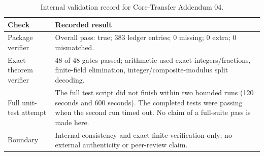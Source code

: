 \begin{table}[htbp]
\centering
\caption{Internal validation record for Core-Transfer Addendum 04.}
\label{tab:validation}
\small
\begin{tabularx}{\textwidth}{@{}L{0.27\textwidth}Y@{}}
\toprule
Check & Recorded result\\
\midrule
Package verifier & Overall pass: true; 383 ledger entries; 0 missing; 0 extra; 0 mismatched.\\
Exact theorem verifier & 48 of 48 gates passed; arithmetic used exact integers/fractions, finite-field elimination, integer/composite-modulus split decoding.\\
Full unit-test attempt & The full test script did not finish within two bounded runs (120 seconds and 600 seconds). The completed tests were passing when the second run timed out. No claim of a full-suite pass is made here.\\
Boundary & Internal consistency and exact finite verification only; no external authenticity or peer-review claim.\\
\bottomrule
\end{tabularx}
\end{table}
